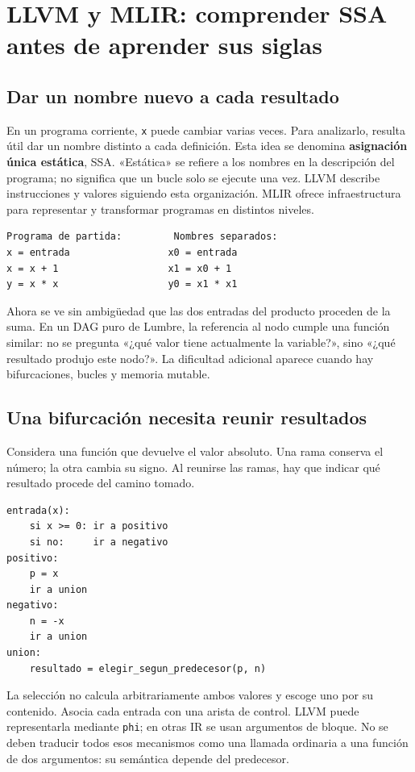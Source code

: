 \documentclass[12pt,a4paper,oneside]{report}
\begin{document}
\chapter{LLVM y MLIR: comprender SSA antes de aprender sus siglas}
\label{ch:ssa-mlir}
\section{Dar un nombre nuevo a cada resultado}
En un programa corriente, \texttt{x} puede cambiar varias veces. Para analizarlo, resulta útil dar un nombre distinto a cada definición. Esta idea se denomina \textbf{asignación única estática}, SSA. «Estática» se refiere a los nombres en la descripción del programa; no significa que un bucle solo se ejecute una vez. LLVM describe instrucciones y valores siguiendo esta organización. MLIR ofrece infraestructura para representar y transformar programas en distintos niveles. \cite{llvm-langref,mlir-paper}

\begin{lstlisting}
Programa de partida:         Nombres separados:
x = entrada                 x0 = entrada
x = x + 1                   x1 = x0 + 1
y = x * x                   y0 = x1 * x1
\end{lstlisting}
Ahora se ve sin ambigüedad que las dos entradas del producto proceden de la suma. En un DAG puro de Lumbre, la referencia al nodo cumple una función similar: no se pregunta «¿qué valor tiene actualmente la variable?», sino «¿qué resultado produjo este nodo?». La dificultad adicional aparece cuando hay bifurcaciones, bucles y memoria mutable.

\section{Una bifurcación necesita reunir resultados}
Considera una función que devuelve el valor absoluto. Una rama conserva el número; la otra cambia su signo. Al reunirse las ramas, hay que indicar qué resultado procede del camino tomado.

\begin{lstlisting}
entrada(x):
    si x >= 0: ir a positivo
    si no:     ir a negativo
positivo:
    p = x
    ir a union
negativo:
    n = -x
    ir a union
union:
    resultado = elegir_segun_predecesor(p, n)
\end{lstlisting}
La selección no calcula arbitrariamente ambos valores y escoge uno por su contenido. Asocia cada entrada con una arista de control. LLVM puede representarla mediante \texttt{phi}; en otras IR se usan argumentos de bloque. No se deben traducir todos esos mecanismos como una llamada ordinaria a una función de dos argumentos: su semántica depende del predecesor. \cite{llvm-langref,mlir-toy}
\end{document}
